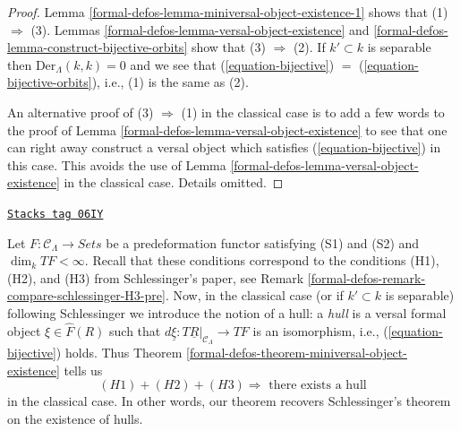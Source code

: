 \begin{proof}
Lemma \ref{formal-defos-lemma-miniversal-object-existence-1}
shows that (1) $\Rightarrow$ (3).
Lemmas \ref{formal-defos-lemma-versal-object-existence} and
\ref{formal-defos-lemma-construct-bijective-orbits}
show that (3) $\Rightarrow$ (2). If $k' \subset k$ is separable
then $\text{Der}_\Lambda(k, k) = 0$ and we see that
(\ref{equation-bijective}) $=$ (\ref{equation-bijective-orbits}), i.e.,
(1) is the same as (2).

\medskip\noindent
An alternative proof of (3) $\Rightarrow$ (1) in the classical case
is to add a few words to the proof of
Lemma \ref{formal-defos-lemma-versal-object-existence}
to see that one can right away construct a versal object which
satisfies (\ref{equation-bijective}) in this case. This avoids the use of
Lemma \ref{formal-defos-lemma-versal-object-existence}
in the classical case. Details omitted.
\end{proof}

\begin{remark}
\label{formal-defos-remark-compare-schlessinger-H3}
\href{https://stacks.math.columbia.edu/tag/06IY}{\texttt{Stacks tag 06IY}}

Let $F : \mathcal{C}_\Lambda \to \textit{Sets}$ be a predeformation functor
satisfying (S1) and (S2) and $\dim_k TF < \infty$.
Recall that these conditions correspond to the conditions
(H1), (H2), and (H3) from Schlessinger's paper, see
Remark \ref{formal-defos-remark-compare-schlessinger-H3-pre}.
Now, in the classical case (or if $k' \subset k$ is separable)
following Schlessinger we introduce the notion of a hull: a {\it hull}
is a versal formal object $\xi \in \widehat{F}(R)$ such that
$d\underline{\xi} : T\underline{R}|_{\mathcal{C}_\Lambda} \to TF$
is an isomorphism, i.e., (\ref{equation-bijective}) holds.
Thus Theorem \ref{formal-defos-theorem-miniversal-object-existence} tells us
$$
(H1) + (H2) + (H3)
\Rightarrow
\text{ there exists a hull}
$$
in the classical case. In other words, our theorem
recovers Schlessinger's theorem on the existence of hulls.
\end{remark}

